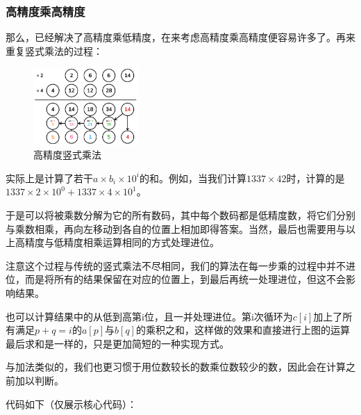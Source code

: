\documentclass{article}
\begin{document}
\subsubsection{高精度乘高精度}

那么，已经解决了高精度乘低精度，在来考虑高精度乘高精度便容易许多了。再来重复竖式乘法的过程：

\begin{figure}[htp]
    \centering
    \includegraphics[width=4cm]{picture/Multiplication-long vertical.png}
    \caption{高精度竖式乘法}
\end{figure}

实际上是计算了若干$a\times b_i \times 10^i $的和。例如，当我们计算$1337\times 42$时，计算的是$1337 \times 2 \times 10^0 + 1337 \times 4 \times 10^1$。

于是可以将被乘数分解为它的所有数码，其中每个数码都是低精度数，将它们分别与乘数相乘，再向左移动到各自的位置上相加即得答案。当然，最后也需要用与以上高精度与低精度相乘运算相同的方式处理进位。

注意这个过程与传统的竖式乘法不尽相同，我们的算法在每一步乘的过程中并不进位，而是将所有的结果保留在对应的位置上，到最后再统一处理进位，但这不会影响结果。

也可以计算结果中的从低到高第i位，且一并处理进位。第i次循环为$c[i]$加上了所有满足$p+q=i$的$a[p]$与$b[q]$的乘积之和，这样做的效果和直接进行上图的运算最后求和是一样的，只是更加简短的一种实现方式。

与加法类似的，我们也更习惯于用位数较长的数乘位数较少的数，因此会在计算之前加以判断。

代码如下（仅展示核心代码）：
\end{document}
